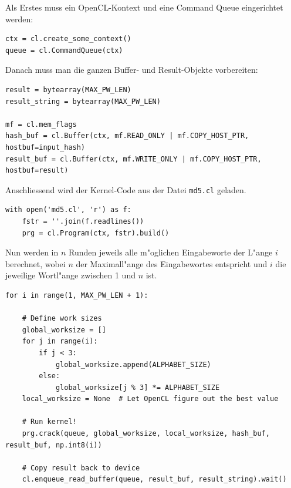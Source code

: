 \begin{refsection}
Als Erstes muss ein OpenCL-Kontext und eine Command Queue eingerichtet werden:

\begin{small}
\begin{verbatim}
ctx = cl.create_some_context()
queue = cl.CommandQueue(ctx)
\end{verbatim}
\end{small}

\noindent Danach muss man die ganzen Buffer- und Result-Objekte vorbereiten:

\begin{small}
\begin{verbatim}
result = bytearray(MAX_PW_LEN)
result_string = bytearray(MAX_PW_LEN)

mf = cl.mem_flags
hash_buf = cl.Buffer(ctx, mf.READ_ONLY | mf.COPY_HOST_PTR, hostbuf=input_hash)
result_buf = cl.Buffer(ctx, mf.WRITE_ONLY | mf.COPY_HOST_PTR, hostbuf=result)
\end{verbatim}
\end{small}

\noindent Anschliessend wird der Kernel-Code aus der Datei \texttt{md5.cl}
geladen.

\begin{small}
\begin{verbatim}
with open('md5.cl', 'r') as f:
    fstr = ''.join(f.readlines())
    prg = cl.Program(ctx, fstr).build()
\end{verbatim}
\end{small}

\noindent Nun werden in $n$ Runden jeweils alle m"oglichen Eingabeworte der
L"ange $i$ berechnet, wobei $n$ der Maximall"ange des Eingabewortes entspricht
und $i$ die jeweilige Wortl"ange zwischen 1 und $n$ ist.

\begin{small}
\begin{verbatim}
for i in range(1, MAX_PW_LEN + 1):

    # Define work sizes
    global_worksize = []
    for j in range(i):
        if j < 3:
            global_worksize.append(ALPHABET_SIZE)
        else:
            global_worksize[j % 3] *= ALPHABET_SIZE
    local_worksize = None  # Let OpenCL figure out the best value

    # Run kernel!
    prg.crack(queue, global_worksize, local_worksize, hash_buf, result_buf, np.int8(i))

    # Copy result back to device
    cl.enqueue_read_buffer(queue, result_buf, result_string).wait()
\end{verbatim}
\end{small}


\end{refsection}
